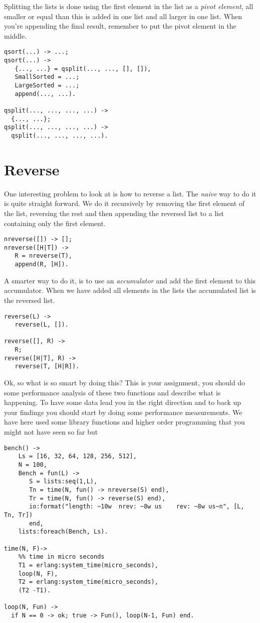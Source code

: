 \documentclass[a4paper,11pt]{article}
\begin{document}
Splitting the lists is done using the first element in the list as a
{\em pivot element}, all smaller or equal than this is added in one
list and all larger in one list. When you're appending the final
result, remember to put the pivot element in the middle.

\begin{verbatim}
qsort(...) -> ...;
qsort(...) ->
   {..., ...} = qsplit(..., ..., [], []),
   SmallSorted = ...;
   LargeSorted = ...;
   append(..., ...).

qsplit(..., ..., ..., ...) ->
  {..., ...};
qsplit(..., ..., ..., ...) ->
  qsplit(..., ..., ..., ...).
\end{verbatim}

\section{Reverse}

One interesting problem to look at is how to reverse a list. The {\em
  naive} way to do it is quite straight forward. We do it recursively
by removing the first element of the list, reversing the rest and then
appending the reversed list to a list containing only the first element.

\begin{verbatim}
nreverse([]) -> [];
nreverse([H|T]) ->
   R = nreverse(T),
   append(R, [H]).
\end{verbatim}

A smarter way to do it, is to use an {\em accumulator} and add the
first element to this accumulator. When we have added all elements in
the lists the accumulated list is the reversed list.

\begin{verbatim}
reverse(L) -> 
   reverse(L, []).

reverse([], R) ->
   R;
reverse([H|T], R) ->
   reverse(T, [H|R]).
\end{verbatim}

Ok, so what is so smart by doing this? This is your assignment, you
should do some performance analysis of these two functions and
describe what is happening. To have some data lead you in the right
direction and to back up your findings you should start by doing some
performance measurements. We have here used some library functions and
higher order programming that you might not have seen so far but 


\begin{verbatim}
bench() ->
    Ls = [16, 32, 64, 128, 256, 512],
    N = 100,
    Bench = fun(L) ->
       S = lists:seq(1,L),
       Tn = time(N, fun() -> nreverse(S) end),
       Tr = time(N, fun() -> reverse(S) end),
       io:format("length: ~10w  nrev: ~8w us    rev: ~8w us~n", [L, Tn, Tr])
       end,
    lists:foreach(Bench, Ls).

time(N, F)->
    %% time in micro seconds
    T1 = erlang:system_time(micro_seconds),
    loop(N, F),
    T2 = erlang:system_time(micro_seconds),
    (T2 -T1).

loop(N, Fun) ->
  if N == 0 -> ok; true -> Fun(), loop(N-1, Fun) end.
\end{verbatim}
\end{document}
